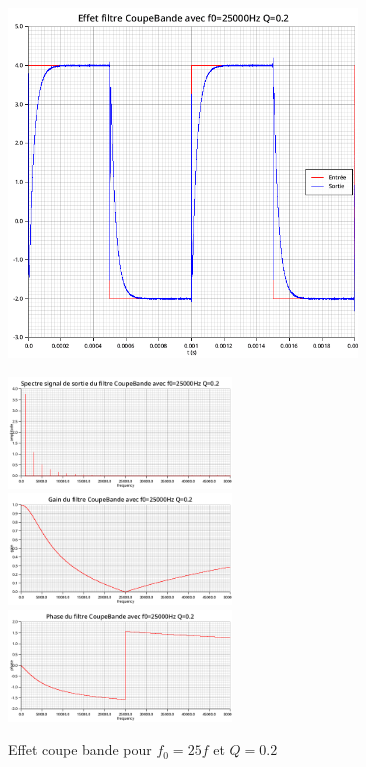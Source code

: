 \documentclass{article}
\begin{document}
\begin{figure}[H]
  \begin{minipage}{0.6\textwidth}
      \centering
      \includegraphics[width=25em]{images/creneau/rejecteur/q=0.2/25/signals.png}
  \end{minipage}
  \begin{minipage}{0.3\textwidth}
      \centering
      \includegraphics[width=16em]{images/creneau/rejecteur/q=0.2/25/fft_out.png}
      \vfill
      \includegraphics[width=16em]{images/creneau/rejecteur/q=0.2/25/gain.png}
      \vfill
      \includegraphics[width=16em]{images/creneau/rejecteur/q=0.2/25/phase.png}
  \end{minipage}
  \caption{Effet coupe bande pour $f_0=25f$ et $Q=0.2$}
\end{figure}
\end{document}

